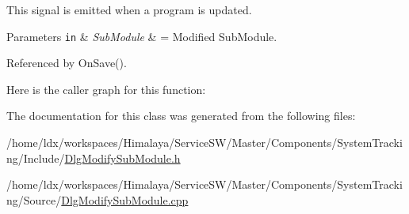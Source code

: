 \-This signal is emitted when a program is updated. 


\begin{DoxyParams}[1]{\-Parameters}
\mbox{\tt in}  & {\em \-Sub\-Module} & = \-Modified \-Sub\-Module. \\
\hline
\end{DoxyParams}


\-Referenced by \-On\-Save().



\-Here is the caller graph for this function\-:




\-The documentation for this class was generated from the following files\-:\begin{DoxyCompactItemize}
\item 
/home/ldx/workspaces/\-Himalaya/\-Service\-S\-W/\-Master/\-Components/\-System\-Tracking/\-Include/\hyperlink{DlgModifySubModule_8h}{\-Dlg\-Modify\-Sub\-Module.\-h}\item 
/home/ldx/workspaces/\-Himalaya/\-Service\-S\-W/\-Master/\-Components/\-System\-Tracking/\-Source/\hyperlink{DlgModifySubModule_8cpp}{\-Dlg\-Modify\-Sub\-Module.\-cpp}\end{DoxyCompactItemize}
